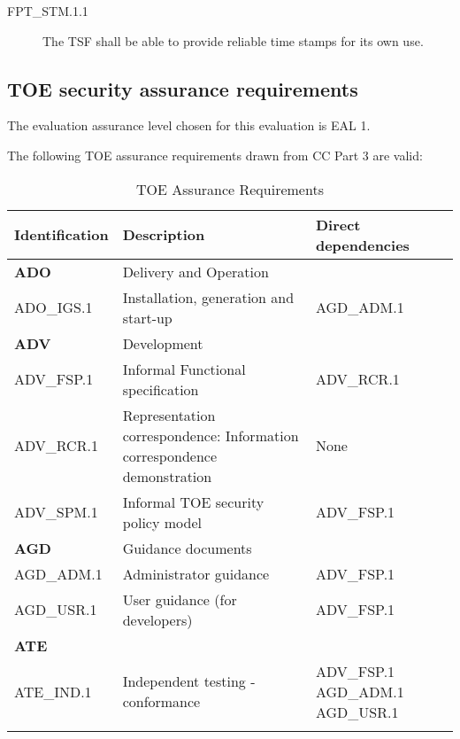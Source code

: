 \documentclass[12pt,english]{scrbook}
\begin{document}
\begin{description}

\item[FPT{\_}STM.1.1]


The TSF shall be able to provide reliable time stamps for its own use.



\end{description}





\subsection{TOE security assurance requirements}

The evaluation assurance level chosen for this evaluation is EAL 1.

The following TOE assurance requirements drawn from CC Part 3 are valid:

\begin{longtable}[c]{lp{7cm}p{3cm}}
  \toprule
  Identification & Description & Direct dependencies\\
  \midrule \endhead

  \textbf{ADO} & Delivery and Operation &  \\
  ADO{\_}IGS.1 & Installation, generation and start-up & AGD{\_}ADM.1 \\
  
  \textbf{ADV} & Development &  \\
  ADV{\_}FSP.1 & Informal Functional specification & ADV{\_}RCR.1 \\

  ADV{\_}RCR.1 & Representation correspondence: Information correspondence
  demonstration & None \\ 

  ADV{\_}SPM.1 & Informal TOE security policy model & ADV\_FSP.1 \\

  \textbf{AGD} & Guidance documents &  \\
  AGD{\_}ADM.1 & Administrator guidance & ADV{\_}FSP.1 \\
  AGD{\_}USR.1 & User guidance (for developers) & ADV{\_}FSP.1 \\
  \textbf{ATE} &  &  \\ 
  ATE{\_}IND.1 & Independent testing - conformance & ADV{\_}FSP.1 AGD{\_}ADM.1 AGD{\_}USR.1 \\


  \bottomrule
  \caption{TOE Assurance Requirements}
            
\end{longtable}
\end{document}
